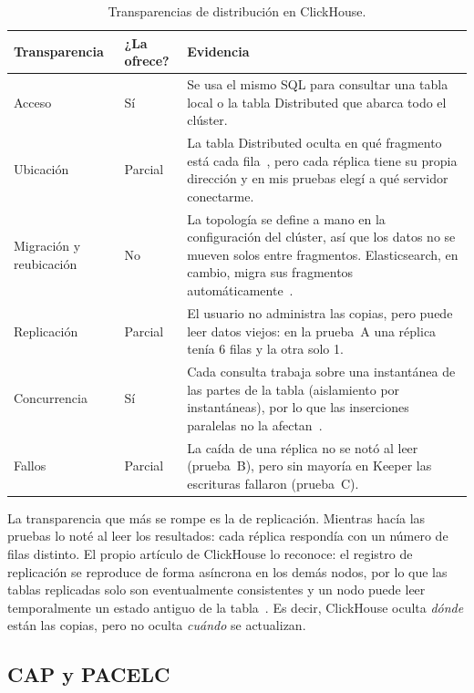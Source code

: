 \documentclass[12pt,a4paper]{article}
\begin{document}
\begin{table}[htbp]
  \centering
  \caption{Transparencias de distribución en ClickHouse.}
  \label{tab:transparencias}
  \small
  \begin{tabularx}{\linewidth}{@{}l l X@{}}
    \toprule
    \textbf{Transparencia} & \textbf{¿La ofrece?} & \textbf{Evidencia} \\
    \midrule
    Acceso & Sí & Se usa el mismo SQL para consultar una tabla local o la
      tabla Distributed que abarca todo el clúster. \\
    Ubicación & Parcial & La tabla Distributed oculta en qué fragmento está
      cada fila~\cite[p.~3732]{schulze2024}, pero cada réplica tiene su
      propia dirección y en mis pruebas elegí a qué servidor conectarme. \\
    Migración y reubicación & No & La topología se define a mano en la
      configuración del clúster, así que los datos no se mueven solos entre
      fragmentos. Elasticsearch, en cambio, migra sus fragmentos
      automáticamente~\cite[p.~2377]{calderon2024}. \\
    Replicación & Parcial & El usuario no administra las copias, pero puede
      leer datos viejos: en la prueba~A una réplica tenía 6 filas y la otra
      solo 1. \\
    Concurrencia & Sí & Cada consulta trabaja sobre una instantánea de las
      partes de la tabla (aislamiento por instantáneas), por lo que las
      inserciones paralelas no la afectan~\cite[p.~3736]{schulze2024}. \\
    Fallos & Parcial & La caída de una réplica no se notó al leer
      (prueba~B), pero sin mayoría en Keeper las escrituras fallaron
      (prueba~C). \\
    \bottomrule
  \end{tabularx}
\end{table}

La transparencia que más se rompe es la de replicación. Mientras hacía
las pruebas lo noté al leer los resultados: cada réplica respondía con
un número de filas distinto. El propio artículo de ClickHouse lo
reconoce: el registro de replicación se reproduce de forma asíncrona en
los demás nodos, por lo que las tablas replicadas solo son
eventualmente consistentes y un nodo puede leer temporalmente un estado
antiguo de la tabla~\cite[p.~3736]{schulze2024}. Es decir, ClickHouse
oculta \emph{dónde} están las copias, pero no oculta \emph{cuándo} se
actualizan.

\subsection{CAP y PACELC}
\end{document}
